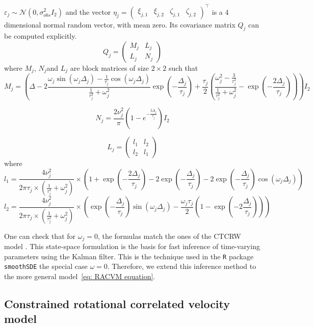 \documentclass[11pt]{article}
\newcommand {\1}{\mathbb{1}}
\begin{document}
$\varepsilon_j \sim \mathcal{N}(0,\sigma_{obs}^2 I_2)$ and the vector $\eta_j=\begin{pmatrix} \xi_{j,1} & \xi_{j,2} & \zeta_{j,1} & \zeta_{j,2} \end{pmatrix}^\top$ is a 4 dimensional normal random vector, with mean zero. Its covariance matrix $Q_j$ can be computed explicitly.
\begin{equation}
	Q_j=\begin{pmatrix}
		M_j & L_j \\
		L_j & N_j
	\end{pmatrix}
	\label{eq: state space covariance}
\end{equation}
where $M_j$, $N_j$and $L_j$ are block matrices of size $2 \times 2$ such that 
\[M_j=\left( \Delta-2 \frac{\omega_j \sin(\omega_j \Delta_j)-\frac{1}{\tau_j} \cos(\omega_j \Delta_j)}{\frac{1}{\tau_j^2}+\omega_j^2 } \exp\left( -\frac{\Delta_j}{\tau_j} \right) +\frac{\tau_j}{2} \left( \frac{\omega_j^2-\frac{3}{\tau_j^2}}{\frac{1}{\tau_j^2}+\omega_j^2}-\exp\left( -\frac{2\Delta_j}{\tau_j}\right)\right) \right)I_2\]

\[N_j=\frac{2\nu_j^2}{\pi}\left(1-e^{-\frac{2 \Delta_j}{\tau_j}}\right)I_2\]

\[L_j=\begin{pmatrix} l_1 & l_2 \\
	l_2 & l_1\end{pmatrix}\]
where 
\[l_1=\frac{4\nu_j^2}{2 \pi \tau_j \times \left( \frac{1}{\tau_j^2}+\omega_j^2\right)} \times \left( 1+\exp\left( -\frac{2\Delta_j}{\tau_j}\right)-2\exp\left( -\frac{\Delta_j}{\tau_j}\right)-2\exp\left( -\frac{\Delta_j}{\tau_j}\right) \cos(\omega_j \Delta_j)\right)\]
\[l_2=\frac{4\nu_j^2}{2 \pi \tau_j \times \left( \frac{1}{\tau_j^2}+\omega_j^2\right)} \times\left( \exp\left( -\frac{\Delta_j}{\tau_j}\right) \sin(\omega_j \Delta_j)-\frac{\omega_j \tau_j}{2} \left(1-\exp\left( -2 \frac{\Delta_j}{\tau_j}\right) \right)\right)\]

One can check that for $\omega_j=0$, the formulas match the ones of the CTCRW model \cite{johnson_continuoustime_2008}.
This state-space formulation is the basis for fast inference of time-varying parameters using the Kalman filter. This is the technique used in the \texttt{R} package \texttt{smoothSDE} \cite{michelot_varying-coefficient_2021} the special case $\omega=0$. Therefore, we extend this inference method to the more general model~\ref{eq: RACVM equation}.

\subsection{Constrained rotational correlated velocity model}
\label{section: CRCVM}
\end{document}

